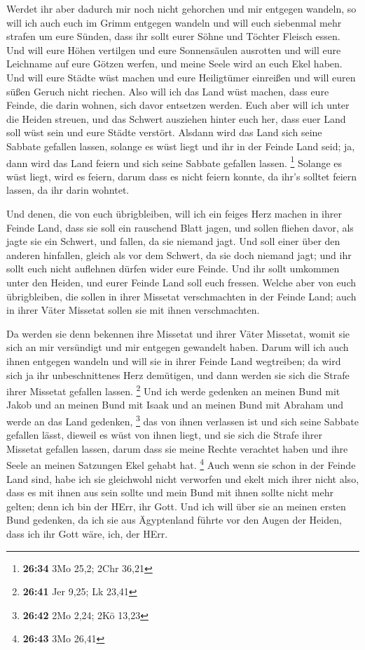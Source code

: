  Werdet ihr aber dadurch mir noch nicht gehorchen und mir
entgegen wandeln,  so will ich auch euch im Grimm entgegen
wandeln und will euch siebenmal mehr strafen um eure Sünden,
 dass ihr sollt eurer Söhne und Töchter Fleisch essen.
 Und will eure Höhen vertilgen und eure Sonnensäulen
ausrotten und will eure Leichname auf eure Götzen werfen, und meine
Seele wird an euch Ekel haben.  Und will eure Städte wüst
machen und eure Heiligtümer einreißen und will euren süßen Geruch nicht
riechen.  Also will ich das Land wüst machen, dass eure
Feinde, die darin wohnen, sich davor entsetzen werden. 
Euch aber will ich unter die Heiden streuen, und das Schwert ausziehen
hinter euch her, dass euer Land soll wüst sein und eure Städte verstört.
 Alsdann wird das Land sich seine Sabbate gefallen lassen,
solange es wüst liegt und ihr in der Feinde Land seid; ja, dann wird das
Land feiern und sich seine Sabbate gefallen lassen. \footnote{\textbf{26:34}
  3Mo 25,2; 2Chr 36,21}  Solange es wüst liegt, wird es
feiern, darum dass es nicht feiern konnte, da ihr's solltet feiern
lassen, da ihr darin wohntet.

 Und denen, die von euch übrigbleiben, will ich ein feiges
Herz machen in ihrer Feinde Land, dass sie soll ein rauschend Blatt
jagen, und sollen fliehen davor, als jagte sie ein Schwert, und fallen,
da sie niemand jagt.  Und soll einer über den anderen
hinfallen, gleich als vor dem Schwert, da sie doch niemand jagt; und ihr
sollt euch nicht auflehnen dürfen wider eure Feinde.  Und
ihr sollt umkommen unter den Heiden, und eurer Feinde Land soll euch
fressen.  Welche aber von euch übrigbleiben, die sollen in
ihrer Missetat verschmachten in der Feinde Land; auch in ihrer Väter
Missetat sollen sie mit ihnen verschmachten.

 Da werden sie denn bekennen ihre Missetat und ihrer Väter
Missetat, womit sie sich an mir versündigt und mir entgegen gewandelt
haben.  Darum will ich auch ihnen entgegen wandeln und will
sie in ihrer Feinde Land wegtreiben; da wird sich ja ihr unbeschnittenes
Herz demütigen, und dann werden sie sich die Strafe ihrer Missetat
gefallen lassen. \footnote{\textbf{26:41} Jer 9,25; Lk 23,41}
 Und ich werde gedenken an meinen Bund mit Jakob und an
meinen Bund mit Isaak und an meinen Bund mit Abraham und werde an das
Land gedenken, \footnote{\textbf{26:42} 2Mo 2,24; 2Kö 13,23}
 das von ihnen verlassen ist und sich seine Sabbate
gefallen lässt, dieweil es wüst von ihnen liegt, und sie sich die Strafe
ihrer Missetat gefallen lassen, darum dass sie meine Rechte verachtet
haben und ihre Seele an meinen Satzungen Ekel gehabt hat. \footnote{\textbf{26:43}
  3Mo 26,41}  Auch wenn sie schon in der Feinde Land sind,
habe ich sie gleichwohl nicht verworfen und ekelt mich ihrer nicht also,
dass es mit ihnen aus sein sollte und mein Bund mit ihnen sollte nicht
mehr gelten; denn ich bin der HErr, ihr Gott.  Und ich will
über sie an meinen ersten Bund gedenken, da ich sie aus Ägyptenland
führte vor den Augen der Heiden, dass ich ihr Gott wäre, ich, der HErr.

